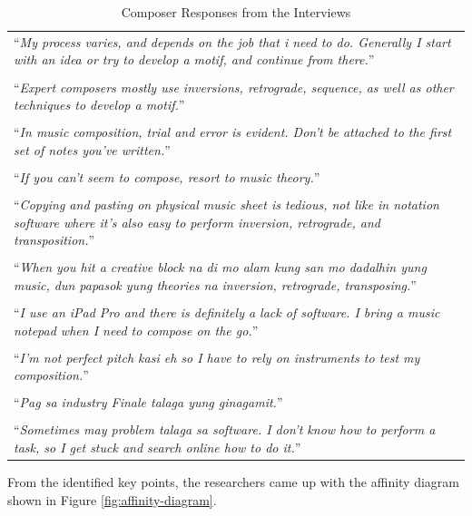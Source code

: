 		\begin{longtable}{|p{14cm}|}
			\caption{Composer Responses from the Interviews} \label{tab:composer-responses} \\ 
		  	\hline
		  		``\textit{My process varies, and depends on the job that i need to do. Generally I start with an idea or try to develop a motif, and continue from there.}'' \\ 
		  		\\
		  		``\textit{Expert composers mostly use inversions, retrograde, sequence, as well as other techniques to develop a motif.}'' \\
		  		\\
		  		``\textit{In music composition, trial and error is evident. Don’t be attached to the first set of notes you’ve written.}'' \\
		  		\\
		  		``\textit{If you can't seem to compose, resort to music theory.}'' \\
		  		\\
		  		``\textit{Copying and pasting on physical music sheet is tedious, not like in notation software where it’s also easy to perform inversion, retrograde, and transposition.}'' \\
		  		\\
		  		``\textit{When you hit a creative block na di mo alam kung san mo dadalhin yung music, dun papasok yung theories na inversion, retrograde, transposing.}'' \\
		  		\\
		  		``\textit{I use an iPad Pro and there is definitely a lack of software. I bring a music notepad when I need to compose on the go.}'' \\
		  		\\
		  		``\textit{I'm not perfect pitch kasi eh so I have to rely on instruments to test my composition.}'' \\
		  		\\
		  		``\textit{Pag sa industry Finale talaga yung ginagamit.}'' \\
		  		\\
		  		``\textit{Sometimes may problem talaga sa software. I don’t know how to perform a task, so I get stuck and search online how to do it.}'' \\
		  	\hline
		\end{longtable}

		From the identified key points, the researchers came up with the affinity diagram shown in Figure \ref{fig:affinity-diagram}. 

